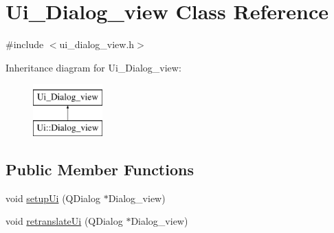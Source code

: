 \hypertarget{class_ui___dialog__view}{}\section{Ui\+\_\+\+Dialog\+\_\+view Class Reference}
\label{class_ui___dialog__view}


{\ttfamily \#include $<$ui\+\_\+dialog\+\_\+view.\+h$>$}

Inheritance diagram for Ui\+\_\+\+Dialog\+\_\+view\+:\begin{figure}[H]
\begin{center}
\leavevmode
\includegraphics[height=2.000000cm]{class_ui___dialog__view}
\end{center}
\end{figure}
\subsection*{Public Member Functions}
\begin{DoxyCompactItemize}
\item 
void \hyperlink{class_ui___dialog__view_afb94a51d635b2bf69733fd2a4ea41952}{setup\+Ui} (Q\+Dialog $\ast$Dialog\+\_\+view)
\item 
void \hyperlink{class_ui___dialog__view_ae834a6e58c7545bcef4d5f0270b331a8}{retranslate\+Ui} (Q\+Dialog $\ast$Dialog\+\_\+view)
\end{DoxyCompactItemize}
